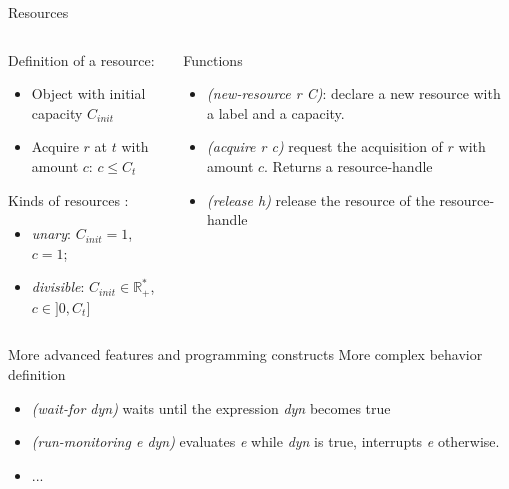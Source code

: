 \begin{frame}[t]{Resources}
    \begin{columns}
        \begin{column}{0.5\textwidth}
            Definition of a resource:
            \begin{itemize}
                \item Object with initial capacity $C_{init}$
                \item Acquire $r$ at $t$ with amount $c$: $c \leq C_t$ 
            \end{itemize}
            Kinds of resources : 
            \begin{itemize}
                \item \emph{unary}: $C_{init} = 1$, $c = 1$;
                \item \emph{divisible}: $C_{init} \in  \mathbb{R}_+^*$, $c \in ]0, C_t]$
            \end{itemize}
        \end{column}
        \begin{column}{0.5\textwidth}
            Functions
            \begin{itemize}
                \item \textit{(new-resource r C)}: declare a new resource with a label and a capacity.
                \item \emph{(acquire r c)} request the acquisition of $r$ with amount $c$. Returns a resource-handle
                \item \emph{(release h)} release the resource of the resource-handle
            \end{itemize}
        \end{column}
    \end{columns}
\end{frame}

\begin{frame}{More advanced features and programming constructs}
    More complex behavior definition
    \begin{itemize}
        \item \textit{(wait-for dyn)} waits until the expression \textit{dyn} becomes true 
        \item \textit{(run-monitoring e dyn)} evaluates \textit{e} while \textit{dyn} is true, interrupts \textit{e} otherwise.
        \item ...
    \end{itemize}
\end{frame}

